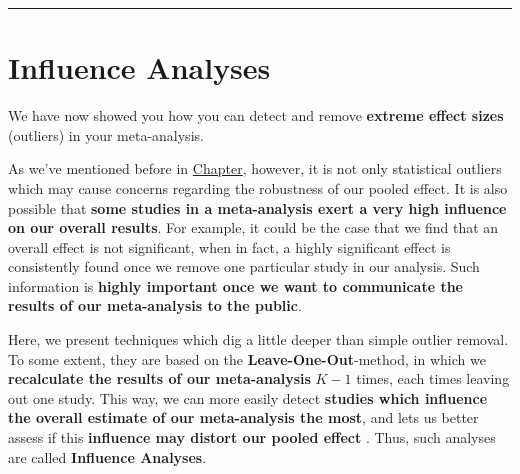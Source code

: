 \documentclass[]{book}
\newenvironment{Shaded}{\begin{snugshade}}{\end{snugshade}}
\newcommand{\ControlFlowTok}[1]{\textcolor[rgb]{0.13,0.29,0.53}{\textbf{#1}}}
\newcommand{\KeywordTok}[1]{\textcolor[rgb]{0.13,0.29,0.53}{\textbf{#1}}}
\newcommand{\NormalTok}[1]{#1}
\newcommand{\OperatorTok}[1]{\textcolor[rgb]{0.81,0.36,0.00}{\textbf{#1}}}
\newcommand{\StringTok}[1]{\textcolor[rgb]{0.31,0.60,0.02}{#1}}
\begin{document}
\begin{Shaded}
\end{Shaded}

\begin{center}\rule{0.5\linewidth}{\linethickness}\end{center}

\hypertarget{influenceanalyses}{%
\section{Influence Analyses}\label{influenceanalyses}}

We have now showed you how you can detect and remove \textbf{extreme effect sizes} (outliers) in your meta-analysis.

As we've mentioned before in \href{}{Chapter}, however, it is not only statistical outliers which may cause concerns regarding the robustness of our pooled effect. It is also possible that \textbf{some studies in a meta-analysis exert a very high influence on our overall results}. For example, it could be the case that we find that an overall effect is not significant, when in fact, a highly significant effect is consistently found once we remove one particular study in our analysis. Such information is \textbf{highly important once we want to communicate the results of our meta-analysis to the public}.

Here, we present techniques which dig a little deeper than simple outlier removal. To some extent, they are based on the \textbf{Leave-One-Out}-method, in which we \textbf{recalculate the results of our meta-analysis} \(K-1\) times, each times leaving out one study. This way, we can more easily detect \textbf{studies which influence the overall estimate of our meta-analysis the most}, and lets us better assess if this \textbf{influence may distort our pooled effect} \citep{viechtbauer2010outlier}. Thus, such analyses are called \textbf{Influence Analyses}.
\end{document}
